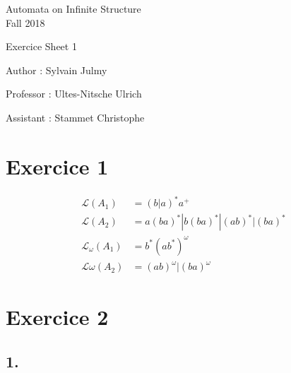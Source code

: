 \documentclass[a4paper,11pt]{report}
\author{Sylvain Julmy}
\date{\today}
\begin{document}
\begin{center}
\Large{
    Automata on Infinite Structure\\
    Fall 2018
  }
  
  \noindent\makebox[\linewidth]{\rule{\linewidth}{0.4pt}}
  Exercice Sheet 1

  \vspace*{1.4cm}

  Author : Sylvain Julmy
  \noindent\makebox[\linewidth]{\rule{\linewidth}{0.4pt}}

  \begin{flushleft}
    Professor : Ultes-Nitsche Ulrich
    
    Assistant : Stammet Christophe
  \end{flushleft}

  \noindent\makebox[\linewidth]{\rule{\textwidth}{1pt}}
\end{center}

\section*{Exercice 1}

\begin{align*}
  \mathcal{L}(A_1) &= (b|a)^*a^+\\ 
  \mathcal{L}(A_2) &= a(ba)^* | b(ba)^* | (ab)^* | (ba)^*\\ 
  \mathcal{L}_\omega(A_1) &= b^* (ab^*)^\omega\\ 
  \mathcal{L}\omega(A_2) &= (ab)^\omega | (ba)^\omega
\end{align*}

\section*{Exercice 2}

\subsection*{1.}

\begin{center}
\end{center}
\end{document}
